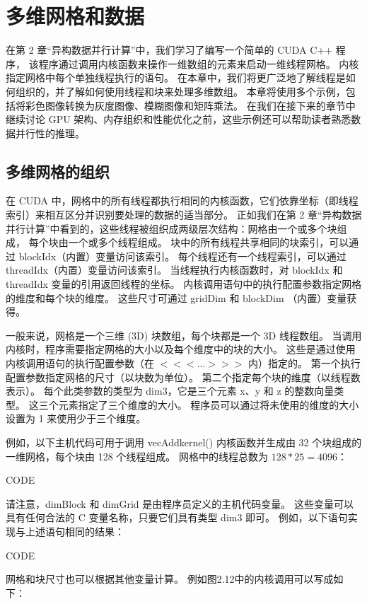 \section{多维网格和数据}
在第 2 章“异构数据并行计算”中，我们学习了编写一个简单的 CUDA C++ 程序，
该程序通过调用内核函数来操作一维数组的元素来启动一维线程网格。 内核指定网格中每个单独线程执行的语句。 
在本章中，我们将更广泛地了解线程是如何组织的，并了解如何使用线程和块来处理多维数组。 
本章将使用多个示例，包括将彩色图像转换为灰度图像、模糊图像和矩阵乘法。 
在我们在接下来的章节中继续讨论 GPU 架构、内存组织和性能优化之前，这些示例还可以帮助读者熟悉数据并行性的推理。

\subsection{多维网格的组织}
在 CUDA 中，网格中的所有线程都执行相同的内核函数，它们依靠坐标（即线程索引）来相互区分并识别要处理的数据的适当部分。 
正如我们在第 2 章“异构数据并行计算”中看到的，这些线程被组织成两级层次结构：网格由一个或多个块组成，
每个块由一个或多个线程组成。 块中的所有线程共享相同的块索引，可以通过 blockIdx（内置）变量访问该索引。 
每个线程还有一个线程索引，可以通过 threadIdx（内置）变量访问该索引。 
当线程执行内核函数时，对 blockIdx 和 threadIdx 变量的引用返回线程的坐标。 
内核调用语句中的执行配置参数指定网格的维度和每个块的维度。 这些尺寸可通过 gridDim 和 blockDim （内置）变量获得。

一般来说，网格是一个三维 (3D) 块数组，每个块都是一个 3D 线程数组。 
当调用内核时，程序需要指定网格的大小以及每个维度中的块的大小。 
这些是通过使用内核调用语句的执行配置参数（在 $<<<...>>>$ 内）指定的。 
第一个执行配置参数指定网格的尺寸（以块数为单位）。 第二个指定每个块的维度（以线程数表示）。 
每个此类参数的类型为 dim3，它是三个元素 x、y 和 z 的整数向量类型。 
这三个元素指定了三个维度的大小。 程序员可以通过将未使用的维度的大小设置为 1 来使用少于三个维度。

例如，以下主机代码可用于调用 vecAddkernel() 内核函数并生成由 32 个块组成的一维网格，每个块由 128 个线程组成。 
网格中的线程总数为 $128 * 25 = 4096$：

{\color{red} CODE}

请注意，dimBlock 和 dimGrid 是由程序员定义的主机代码变量。 
这些变量可以具有任何合法的 C 变量名称，只要它们具有类型 dim3 即可。 例如，以下语句实现与上述语句相同的结果：

{\color{red} CODE}

网格和块尺寸也可以根据其他变量计算。 例如图2.12中的内核调用可以写成如下：

